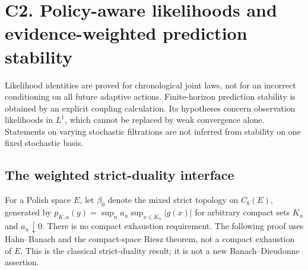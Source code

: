 \section{C2. Policy-aware likelihoods and evidence-weighted prediction stability}
\label{sec:r33-c2}

Likelihood identities are proved for chronological joint laws, not for an
incorrect conditioning on all future adaptive actions.  Finite-horizon
prediction stability is obtained by an explicit coupling calculation.  Its
hypotheses concern observation likelihoods in $L^1$, which cannot be replaced
by weak convergence alone.  Statements on varying stochastic filtrations are
not inferred from stability on one fixed stochastic basis.

\subsection{The weighted strict-duality interface}

For a Polish space $E$, let $\beta_0$ denote the mixed strict topology on
$C_b(E)$, generated by
$p_{K,a}(g)=\sup_n a_n\sup_{x\in K_n}|g(x)|$ for arbitrary compact sets
$K_n$ and $a_n\downarrow0$.  There is no compact exhaustion requirement.
The following proof uses Hahn--Banach and the compact-space Riesz theorem,
not a compact exhaustion of $E$.  This is the classical strict-duality
result; it is not a new Banach--Dieudonne assertion.

